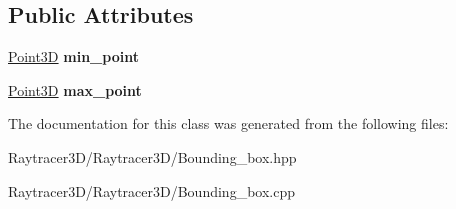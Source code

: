\subsection*{Public Attributes}
\begin{DoxyCompactItemize}
\item 
\hypertarget{class_bounding__box_add720cf740129c859bddbbed01727c48}{}\label{class_bounding__box_add720cf740129c859bddbbed01727c48} 
\hyperlink{class_point3_d}{Point3D} {\bfseries min\+\_\+point}
\item 
\hypertarget{class_bounding__box_a1ee058e226dbf771065c67d62cac8c66}{}\label{class_bounding__box_a1ee058e226dbf771065c67d62cac8c66} 
\hyperlink{class_point3_d}{Point3D} {\bfseries max\+\_\+point}
\end{DoxyCompactItemize}


The documentation for this class was generated from the following files\+:\begin{DoxyCompactItemize}
\item 
Raytracer3\+D/\+Raytracer3\+D/Bounding\+\_\+box.\+hpp\item 
Raytracer3\+D/\+Raytracer3\+D/Bounding\+\_\+box.\+cpp\end{DoxyCompactItemize}
